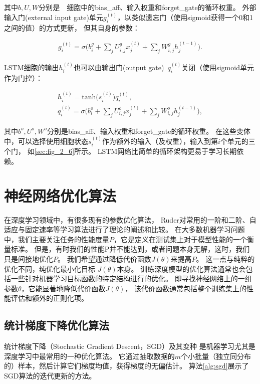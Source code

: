 其中$b, U, W$分别是~~细胞中的\gls{bias_aff}、输入权重和\gls{forget_gate}的循环权重。
外部输入门(external input gate)单元$g_i^{(t)}$，以类似遗忘门（使用sigmoid获得一个0和1之间的值）的方式更新，
但其自身的参数：\par

\begin{equation}
	\begin{aligned}
	g_i^{(t)} = \sigma \Big( b_i^g + \sum_j U_{i,j}^g x_j^{(t)} + \sum_j W_{i,j}^g h_j^{(t-1)} \Big).
	\end{aligned}
\end{equation}

LSTM细胞的输出$h_i^{(t)}$也可以由输出门(output gate)~$q_i^{(t)}$关闭（使用sigmoid单元作为门控）：\par
\begin{equation}
	\begin{gathered}
		h_i^{(t)} = \text{tanh}\big( s_i^{(t)} \big) q_i^{(t)}, \\
		q_i^{(t)} = \sigma \Big( b_i^o + \sum_j U_{i,j}^o x_j^{(t)} + \sum_j W_{i,j}^o h_j^{(t-1)} \Big),
	\end{gathered}
\end{equation}

其中$b^o, U^o, W^o$分别是\gls{bias_aff}、输入权重和\gls{forget_gate}的循环权重。
在这些变体中，可以选择使用细胞状态$s_i^{(t)}$作为额外的输入（及权重），输入到第$i$个单元的三个门，
如\ref{sec:fig_2_6}所示。
LSTM网络比简单的循环架构更易于学习长期依赖。

\section{神经网络优化算法}
在深度学习领域中，有很多现有的参数优化算法，
Ruder对常用的一阶和二阶、自适应与固定速率等学习算法进行了理论的阐述和比较\cite{ruder2016overview}。
在大多数机器学习问题中，我们主要关注任务的性能度量$P$，它是定义在测试集上对于模型性能的一个衡量标准。
但是，有时我们的性能P并不能达到，或者问题本身无解，这时，我们只是间接地优化$P$。
我们希望通过降低代价函数$J(\theta)$来提高$P$。
这一点与纯粹的优化不同，纯优化最小化目标 $J(\theta)$本身。
训练深度模型的优化算法通常也会包括一些针对机器学习目标函数的特定结构进行的优化。
即寻找神经网络上的一组参数$\theta$，它能显著地降低代价函数$J(\theta)$，
该代价函数通常包括整个训练集上的性能评估和额外的正则化项。

\subsection{统计梯度下降优化算法}
统计梯度下降（Stochastic Gradient Descent，SGD）及其变种
是机器学习尤其是深度学习中最常用的一种优化算法\cite{bottou2010large}。
它通过抽取数据的$m$个小批量（独立同分布的）样本，然后计算它们梯度均值，获得梯度的无偏估计。
算法\ref{alg:sgd}展示了SGD算法的迭代更新的方法。

